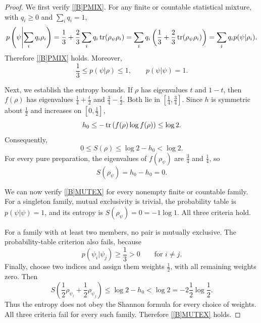 \documentclass{techbrief}
\begin{document}
\begin{proof}
	We first verify \ref{[B]PMIX}. For any finite or countable
	statistical mixture, with $q_i\geq0$ and $\sum_iq_i=1$,
	\begin{equation*}
		\begin{aligned}
			p\left(\psi\middle|\sum_iq_i\rho_i\right)
			=\frac{1}{3}
			+\frac{2}{3}\sum_iq_i\operatorname{tr}(\rho_\psi\rho_i)
			=\sum_iq_i\left(
			\frac{1}{3}+\frac{2}{3}\operatorname{tr}(\rho_\psi\rho_i)
			\right)
			=\sum_iq_i p(\psi|\rho_i).
		\end{aligned}
	\end{equation*}
	Therefore \ref{[B]PMIX} holds. Moreover,
	\begin{equation*}
		\frac{1}{3}\leq p(\psi|\rho)\leq1,
		\qquad p(\psi|\psi)=1.
	\end{equation*}
	
	Next, we establish the entropy bounds. If $\rho$ has
	eigenvalues $t$ and $1-t$, then $f(\rho)$ has eigenvalues
	$\frac{1}{4}+\frac{t}{2}$ and
	$\frac{3}{4}-\frac{t}{2}$. Both lie in
	$[\frac{1}{4},\frac{3}{4}]$. Since $h$ is symmetric about
	$\frac{1}{2}$ and increases on $[0,\frac{1}{2}]$,
	\begin{equation*}
		h_0\leq-\operatorname{tr}\left(f(\rho)\log f(\rho)\right)\leq\log2.
	\end{equation*}
	Consequently,
	\begin{equation*}
		0\leq S(\rho)\leq\log2-h_0<\log2.
	\end{equation*}
	For every pure preparation, the eigenvalues of $f(\rho_\psi)$
	are $\frac{3}{4}$ and $\frac{1}{4}$, so
	\begin{equation*}
		S(\rho_\psi)=h_0-h_0=0.
	\end{equation*}
	
	We can now verify \ref{[B]MUTEX} for every nonempty finite
	or countable family. For a singleton family, mutual
	exclusivity is trivial, the probability table is
	$p(\psi|\psi)=1$, and its entropy is
	$S(\rho_\psi)=0=-1\log1$. All three criteria hold.
	
	For a family with at least two members, no pair is mutually
	exclusive. The probability-table criterion also fails,
	because
	\begin{equation*}
		p(\psi_i|\psi_j)\geq\frac{1}{3}>0
		\qquad\text{for }i\neq j.
	\end{equation*}
	Finally, choose two indices and assign them weights
	$\frac{1}{2}$, with all remaining weights zero. Then
	\begin{equation*}
		S\left(\frac{1}{2}\rho_{\psi_i}
		+\frac{1}{2}\rho_{\psi_j}\right)
		\leq\log2-h_0
		<\log2
		=-2\frac{1}{2}\log\frac{1}{2}.
	\end{equation*}
	Thus the entropy does not obey the Shannon formula for
	every choice of weights. All three criteria fail for
	every such family. Therefore \ref{[B]MUTEX} holds.
	

\end{proof}
\end{document}
